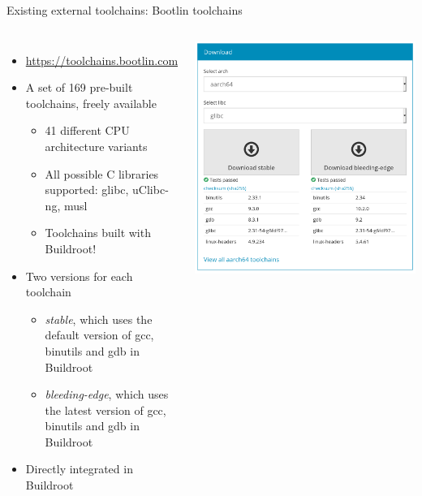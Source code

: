\begin{frame}{Existing external toolchains: Bootlin toolchains}
  \begin{columns}
    \begin{itemize}
    \item \url{https://toolchains.bootlin.com}
    \item A set of 169 pre-built toolchains, freely available
      \begin{itemize}
      \item 41 different CPU architecture variants
      \item All possible C libraries supported: glibc, uClibc-ng, musl
      \item Toolchains built with Buildroot!
      \end{itemize}
    \item Two versions for each toolchain
      \begin{itemize}
      \item {\em stable}, which uses the default version of gcc,
        binutils and gdb in Buildroot
      \item {\em bleeding-edge}, which uses the latest version of gcc,
        binutils and gdb in Buildroot
      \end{itemize}
    \item Directly integrated in Buildroot
    \end{itemize}
    \begin{center}
      \includegraphics[height=0.5\textheight]{slides/buildroot-toolchain/bootlin-toolchains-com.png}

\end{center}
\end{columns}
\end{frame}
